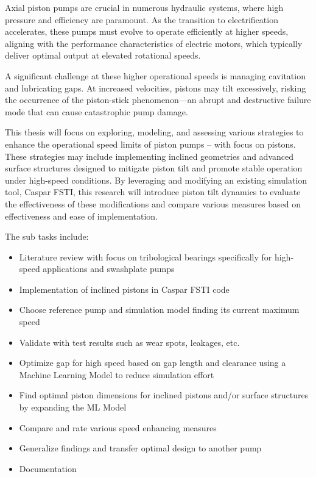 
\begin{task} %
    \minisec{\objectivesname}\smallskip

    Axial piston pumps are crucial in numerous hydraulic systems, where high pressure and efficiency
    are paramount. As the transition to electrification accelerates, these pumps must evolve to operate
    efficiently at higher speeds, aligning with the performance characteristics of electric motors, which
    typically deliver optimal output at elevated rotational speeds.
    
    A significant challenge at these higher operational speeds is managing cavitation and lubricating gaps. 
    At increased velocities, pistons may tilt excessively, risking the occurrence of the piston-stick 
    phenomenon—an abrupt and destructive failure mode that can cause catastrophic pump damage.
    
    This thesis will focus on exploring, modeling, and assessing various strategies to enhance the
    operational speed limits of piston pumps – with focus on pistons. These strategies may include
    implementing inclined geometries and advanced surface structures designed to mitigate piston tilt
    and promote stable operation under high-speed conditions. By leveraging and modifying an existing
    simulation tool, Caspar FSTI, this research will introduce piston tilt dynamics to evaluate the
    effectiveness of these modifications and compare various measures based on effectiveness and
    ease of implementation.
    
    The sub tasks include:
    \begin{itemize}
        \item Literature review with focus on tribological bearings specifically for high-speed
              applications and swashplate pumps
        \item Implementation of inclined pistons in Caspar FSTI code
        \item Choose reference pump and simulation model finding its current maximum speed
        \item Validate with test results such as wear spots, leakages, etc.
        \item Optimize gap for high speed based on gap length and clearance using a Machine
              Learning Model to reduce simulation effort
        \item Find optimal piston dimensions for inclined pistons and/or surface structures by
              expanding the ML Model
        \item Compare and rate various speed enhancing measures
        \item Generalize findings and transfer optimal design to another pump
        \item Documentation
    \end{itemize}
    

\end{task}
